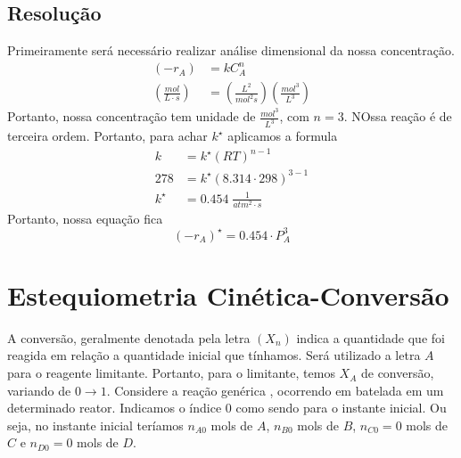 \subsection{Resolução}
Primeiramente será necessário realizar análise dimensional da nossa concentração.
\begin{align*}
    \left( -r_A \right) &= k C_A^n \\
    \left( \frac{mol}{L \cdot s} \right) &= \left( \frac{L^{2}}{mol ^{2} s}  \right)  \left( \frac{mol^{3}}{L^{3} } \right)      
\end{align*}
Portanto, nossa concentração tem unidade de \(\frac{mol^{3} }{L^{3} }\), com \(n = 3\). NOssa reação
é de terceira ordem. Portanto, para achar \(k^{\star} \) aplicamos a formula
\begin{align*}
    k &= k^{\star} \left( RT \right)^{n-1} \\
    278 &= k^{\star} \left( 8.314 \cdot 298 \right)^{3-1} \\
    k^{\star} &= 0.454 \; \frac{1}{atm^{2} \cdot s}
\end{align*} 
Portanto, nossa equação fica
\begin{equation*}
    \left( -r_A \right)^{\star} = 0.454 \cdot P_A^3
\end{equation*}
\section{Estequiometria Cinética-Conversão}
A conversão, geralmente denotada pela letra \((X_n)\) indica a quantidade que foi reagida em relação
a quantidade inicial que tínhamos. Será utilizado a letra \(A\) para o reagente limitante. Portanto,
para o limitante, temos \(X_A\) de conversão, variando de \(0 \to 1\). Considere a reação
genérica , ocorrendo em batelada em um determinado reator. Indicamos o índice
\(0\)  como sendo para o instante inicial. Ou seja, no instante inicial teríamos \(n_{A0} \) mols de
\(A\), \(n_{B0} \) mols de \(B\), \(n_{C0} = 0\) mols de \(C\) e \(n_{D0} = 0\) mols de \(D\). \par

\begin{figure}[ht]
	\centering
	\caption{}
	\\
	\label{fig:Reator_Batelada}
\end{figure}

